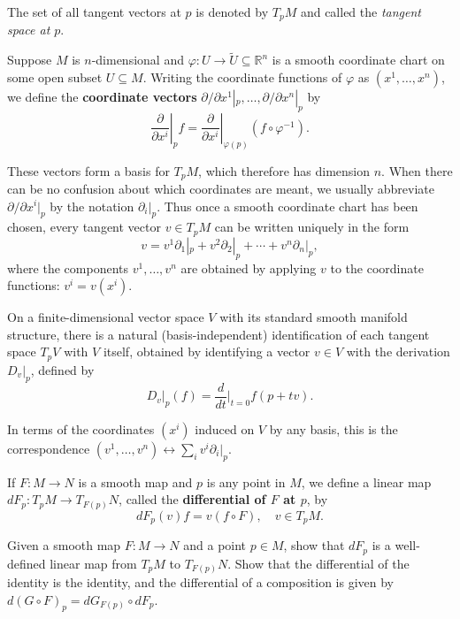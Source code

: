 The set of all tangent vectors at $p$ is denoted by $T_p M$ and called the \textit{tangent space
at $p$}.

Suppose $M$ is $n$-dimensional and $\varphi : U \to \tilde{U} \subseteq \mathbb{R}^n$ is a smooth coordinate chart
on some open subset $U \subseteq M$. Writing the coordinate functions of $\varphi$ as $(x^1, \ldots, x^n)$,
we define the \textbf{coordinate vectors} $\partial/\partial x^1|_p, \ldots, \partial/\partial x^n|_p$ by
\begin{equation}
\left.\frac{\partial}{\partial x^i}\right|_p f = \left.\frac{\partial}{\partial x^i}\right|_{\varphi(p)} (f \circ \varphi^{-1}).
\tag{A.2}
\end{equation}

These vectors form a basis for $T_p M$, which therefore has dimension $n$. When there can be no confusion about which coordinates are meant, we usually abbreviate $\partial/\partial x^i|_p$ by the notation $\partial_i|_p$. Thus once a smooth coordinate chart has been chosen, every tangent vector $v \in T_p M$ can be written uniquely in the form
\begin{equation}
v = v^1 \partial_1|_p + v^2 \partial_2|_p + \cdots + v^n \partial_n|_p,
\tag{A.3}
\end{equation}
where the components $v^1, \ldots, v^n$ are obtained by applying $v$ to the coordinate functions: $v^i = v(x^i)$.

On a finite-dimensional vector space $V$ with its standard smooth manifold structure, there is a natural (basis-independent) identification of each tangent space $T_p V$ with $V$ itself, obtained by identifying a vector $v \in V$ with the derivation $D_v|_p$, defined by
\begin{equation}
D_v|_p(f) = \frac{d}{dt}\bigg|_{t=0} f(p + tv).
\end{equation}

In terms of the coordinates $(x^i)$ induced on $V$ by any basis, this is the correspondence $(v^1, \ldots, v^n) \leftrightarrow \sum_i v^i \partial_i|_p$.

If $F: M \to N$ is a smooth map and $p$ is any point in $M$, we define a linear map $dF_p: T_p M \to T_{F(p)} N$, called the \textbf{differential of $F$ at $p$}, by
\begin{equation}
dF_p(v)f = v(f \circ F), \quad v \in T_p M.
\end{equation}

\begin{exercise}\label{exer:differential-well-defined-functorial}
Given a smooth map $F: M \to N$ and a point $p \in M$, show that $dF_p$ is a well-defined linear map from $T_p M$ to $T_{F(p)} N$. Show that the differential of the identity is the identity, and the differential of a composition is given by $d(G \circ F)_p = dG_{F(p)} \circ dF_p$.
\end{exercise}

